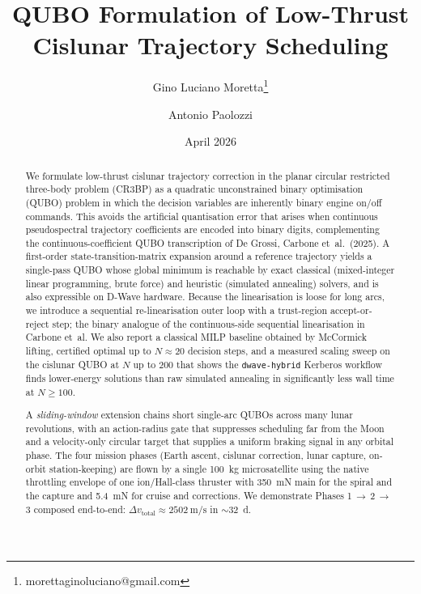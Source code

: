 \documentclass[11pt,a4paper]{article}
\title{\textbf{QUBO Formulation of Low-Thrust Cislunar Trajectory Scheduling}}
\author[1]{Gino Luciano Moretta\thanks{morettaginoluciano@gmail.com}}
\author[1]{Antonio Paolozzi}
\affil[1]{School of Aerospace Engineering, Sapienza Universit\`a di Roma}
\date{April 2026}
\theoremstyle{plain}
\begin{document}
\maketitle

\begin{abstract}
We formulate low-thrust cislunar trajectory correction in the planar circular restricted three-body problem (CR3BP) as a quadratic unconstrained binary optimisation (QUBO) problem in which the decision variables are inherently binary engine on/off commands. This avoids the artificial quantisation error that arises when continuous pseudospectral trajectory coefficients are encoded into binary digits, complementing the continuous-coefficient QUBO transcription of De Grossi, Carbone et~al.~(2025). A first-order state-transition-matrix expansion around a reference trajectory yields a single-pass QUBO whose global minimum is reachable by exact classical (mixed-integer linear programming, brute force) and heuristic (simulated annealing) solvers, and is also expressible on D-Wave hardware. Because the linearisation is loose for long arcs, we introduce a sequential re-linearisation outer loop with a trust-region accept-or-reject step; the binary analogue of the continuous-side sequential linearisation in Carbone et~al. We also report a classical MILP baseline obtained by McCormick lifting, certified optimal up to $N{\approx}20$ decision steps, and a measured scaling sweep on the cislunar QUBO at $N$ up to $200$ that shows the \texttt{dwave-hybrid} Kerberos workflow finds lower-energy solutions than raw simulated annealing in significantly less wall time at $N \ge 100$.

A \emph{sliding-window} extension chains short single-arc QUBOs across many lunar revolutions, with an action-radius gate that suppresses scheduling far from the Moon and a velocity-only circular target that supplies a uniform braking signal in any orbital phase. The four mission phases (Earth ascent, cislunar correction, lunar capture, on-orbit station-keeping) are flown by a single \SI{100}{\kg} microsatellite using the native throttling envelope of one ion/Hall-class thruster with \SI{350}{\milli\newton} main for the spiral and the capture and \SI{5.4}{\milli\newton} for cruise and corrections. We demonstrate Phases 1\,$\to$\,2\,$\to$\,3 composed end-to-end: $\Delta v_\mathrm{total} \approx \SI{2502}{\meter\per\second}$ in $\sim$\SI{32}{\day}.
\end{abstract}
\end{document}

